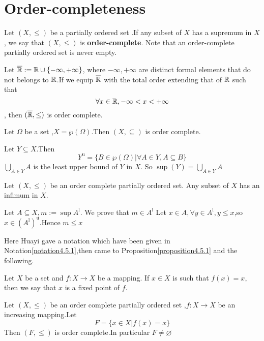 \documentclass{book}
\numberwithin{equation}{section}
\begin{document}
\section{Order-completeness}
\begin{definitionenv}
    Let $(X,\le)$ be a partially ordered set .If any subset of $X$ has a supremum in $X$, we say that  $(X, \le)$ is \textbf{order-complete}. Note that an order-complete
partially ordered set is never empty.
\end{definitionenv}
\begin{axiomenv}
    Let $\overline{\mathbb{R}}:=\mathbb{R}\cup\{-\infty,+\infty\}$, where $-\infty,+\infty$ are distinct formal elements that do not belongs to $\mathbb{R}$.If we equip $\overline{\mathbb{R}}$ with the total order extending that of $\mathbb{R}$ such that 
    $$\forall x\in \mathbb{R},-\infty<x<+\infty$$, then $(\overline{\mathbb{R}},\le)$ is order complete.
\end{axiomenv}
\begin{exampleenv}
    Let $\Omega$ be a set ,$X=\wp(\Omega)$.Then $(X,\subseteq)$ is  order complete.
    \begin{proofenv}
        Let $Y\subseteq X$.Then 
        $$Y^{\mathrm{u}}=\{B\in\wp(\Omega)|\forall A\in Y,A\subseteq B\}$$
        $\displaystyle \bigcup_{A\in Y}A$ is the least upper bound of $Y$ in $X$. So $\sup (Y)=\bigcup_{A\in Y}A$
    \end{proofenv}
\end{exampleenv}
\begin{propositionenv}
    Let $(X,\le)$ be an order complete partially ordered set. Any subset of $X$ has an infimum in $X$.
\end{propositionenv}
\begin{proofenv}
    Let $A\subseteq X,m:=\sup A^\mathrm{l}$. We prove that $m\in A^\mathrm{l}$
    \newline
    Let $x\in A,\forall y \in A^\mathrm{l},y\le x $,so $x\in (A^\mathrm{l})^\mathrm{u}$.Hence $m\le x$
\end{proofenv}
Here Huayi gave a notation which have been given in Notation\ref{notation4.5.1},then came to Proposition\ref{proposition4.5.1} and the following.
\begin{definitionenv}
    Let $X$ be a set and $f:X\rightarrow X$ be a mapping. If $x\in X $ is such that $f(x)=x$, then we say that $x$ is a fixed point of $f$. 
\end{definitionenv}
\begin{theoremenv}
    \quad
    \newline
    Let $(X,\le)$ be an order complete partially ordered set ,$f:X\rightarrow X$ be an increasing mapping.Let 
    $$F=\{x\in X|f(x)=x\}$$
    Then $(F,\le)$ is order complete.In particular $F\not=\varnothing$
    
\end{theoremenv}
\end{document}
